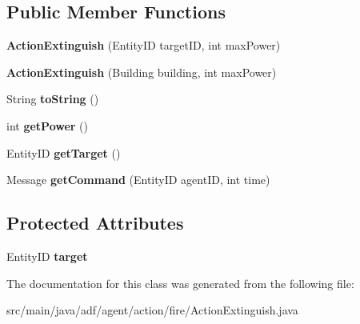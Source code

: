 \subsection*{Public Member Functions}
\begin{DoxyCompactItemize}
\item 
\hypertarget{classadf_1_1agent_1_1action_1_1fire_1_1ActionExtinguish_a71b5feb48519721e31eb8d8b9ec24b56}{}\label{classadf_1_1agent_1_1action_1_1fire_1_1ActionExtinguish_a71b5feb48519721e31eb8d8b9ec24b56} 
{\bfseries Action\+Extinguish} (Entity\+ID target\+ID, int max\+Power)
\item 
\hypertarget{classadf_1_1agent_1_1action_1_1fire_1_1ActionExtinguish_a9bb366ec06f181b38dd161d24f32ab6c}{}\label{classadf_1_1agent_1_1action_1_1fire_1_1ActionExtinguish_a9bb366ec06f181b38dd161d24f32ab6c} 
{\bfseries Action\+Extinguish} (Building building, int max\+Power)
\item 
\hypertarget{classadf_1_1agent_1_1action_1_1fire_1_1ActionExtinguish_a409f07138feced350503502b98075b8f}{}\label{classadf_1_1agent_1_1action_1_1fire_1_1ActionExtinguish_a409f07138feced350503502b98075b8f} 
String {\bfseries to\+String} ()
\item 
\hypertarget{classadf_1_1agent_1_1action_1_1fire_1_1ActionExtinguish_a300cc94f9d9af74310dcc86ff5a254a4}{}\label{classadf_1_1agent_1_1action_1_1fire_1_1ActionExtinguish_a300cc94f9d9af74310dcc86ff5a254a4} 
int {\bfseries get\+Power} ()
\item 
\hypertarget{classadf_1_1agent_1_1action_1_1fire_1_1ActionExtinguish_af47ac8ae164313f7ce8ee7035e2095b0}{}\label{classadf_1_1agent_1_1action_1_1fire_1_1ActionExtinguish_af47ac8ae164313f7ce8ee7035e2095b0} 
Entity\+ID {\bfseries get\+Target} ()
\item 
\hypertarget{classadf_1_1agent_1_1action_1_1fire_1_1ActionExtinguish_a4aea8c37d2298767efb3c05c63414960}{}\label{classadf_1_1agent_1_1action_1_1fire_1_1ActionExtinguish_a4aea8c37d2298767efb3c05c63414960} 
Message {\bfseries get\+Command} (Entity\+ID agent\+ID, int time)
\end{DoxyCompactItemize}
\subsection*{Protected Attributes}
\begin{DoxyCompactItemize}
\item 
\hypertarget{classadf_1_1agent_1_1action_1_1fire_1_1ActionExtinguish_af2154ee8ad5aac2e8dea5e13d70432f2}{}\label{classadf_1_1agent_1_1action_1_1fire_1_1ActionExtinguish_af2154ee8ad5aac2e8dea5e13d70432f2} 
Entity\+ID {\bfseries target}
\end{DoxyCompactItemize}


The documentation for this class was generated from the following file\+:\begin{DoxyCompactItemize}
\item 
src/main/java/adf/agent/action/fire/Action\+Extinguish.\+java\end{DoxyCompactItemize}
